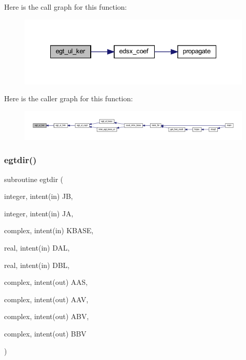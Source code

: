 Here is the call graph for this function\+:\nopagebreak
\begin{figure}[H]
\begin{center}
\leavevmode
\includegraphics[width=335pt]{Leroi_8f90_a8f7098d7bc36902fbbda312874c15120_cgraph}
\end{center}
\end{figure}
Here is the caller graph for this function\+:\nopagebreak
\begin{figure}[H]
\begin{center}
\leavevmode
\includegraphics[width=350pt]{Leroi_8f90_a8f7098d7bc36902fbbda312874c15120_icgraph}
\end{center}
\end{figure}
\mbox{\label{Leroi_8f90_a24151574c4bb3d7844db88f91d23b589}} 
\subsubsection{\texorpdfstring{egtdir()}{egtdir()}}
{\footnotesize\ttfamily subroutine egtdir (\begin{DoxyParamCaption}\item[{integer, intent(in)}]{JB,  }\item[{integer, intent(in)}]{JA,  }\item[{complex, intent(in)}]{K\+B\+A\+SE,  }\item[{real, intent(in)}]{D\+AL,  }\item[{real, intent(in)}]{D\+BL,  }\item[{complex, intent(out)}]{A\+AS,  }\item[{complex, intent(out)}]{A\+AV,  }\item[{complex, intent(out)}]{A\+BV,  }\item[{complex, intent(out)}]{B\+BV }\end{DoxyParamCaption})}

